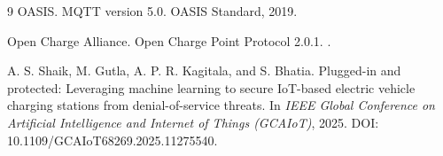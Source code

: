 \documentclass[11pt]{article}
\begin{document}
\begin{thebibliography}{9}
OASIS.
\newblock MQTT version 5.0.
\newblock OASIS Standard, 2019.

Open Charge Alliance.
\newblock Open Charge Point Protocol 2.0.1.
.

A. S. Shaik, M. Gutla, A. P. R. Kagitala, and S. Bhatia.
\newblock Plugged-in and protected: Leveraging machine learning to secure IoT-based
electric vehicle charging stations from denial-of-service threats.
\newblock In \emph{IEEE Global Conference on Artificial Intelligence and Internet of
Things (GCAIoT)}, 2025. DOI: 10.1109/GCAIoT68269.2025.11275540.

\end{thebibliography}
\end{document}
